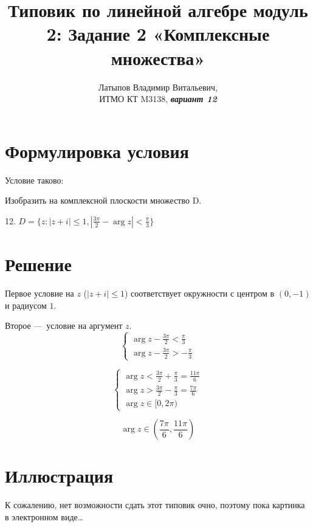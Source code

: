 \documentclass[12pt, a4paper]{article}
\author{Латыпов Владимир Витальевич, \\ ИТМО КТ M3138, \Huge{\textit{\textbf{вариант 12}}}}
\title{Типовик по линейной алгебре модуль 2: Задание 2 «Комплексные множества»}
\begin{document}
    \tittoc

    \section{Формулировка условия}

    \begin{statement}
        Условие таково: 
        
        Изобразить на комплексной плоскости множество D.

        12. $D = \{z : |z + i| \leqslant 1, \left|\frac{3π}{2} − \arg z \right| < \frac{π}{3} \}$
    \end{statement}

    \section{Решение}

    Первое условие на $z$ ($|z + i| \leqslant 1$) 
    соответствует окружности с центром в $(0, -1)$ и радиусом $1$.

    Второе — условие на аргумент $z$.
    \begin{equation}
        \begin{cases}
            \arg z - \frac{3π}{2} < \frac{\pi}{3} \\
            \arg z - \frac{3π}{2} > -\frac{\pi}{3}
        \end{cases}
    \end{equation}

    \begin{equation}
        \begin{cases}
            \arg z < \frac{3π}{2} + \frac{\pi}{3} = \frac{11\pi}{6} \\
            \arg z > \frac{3π}{2} - \frac{\pi}{3} = \frac{7\pi}{6} \\
            \arg z \in [0, 2\pi)
        \end{cases}
    \end{equation}

    \begin{equation}
        \arg z \in \left(\frac{7\pi}{6}, \frac{11\pi}{6}\right)
    \end{equation}


    \section{Иллюстрация}

    К сожалению, нет возможности сдать этот типовик очно, 
    поэтому пока картинка в электронном виде…
\end{document}
